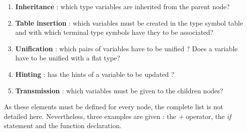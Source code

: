 \documentclass[a4paper,11pt]{article}
\begin{document}
\begin{enumerate}
	\item \textbf{Inheritance} : which type variables are inherited from the parent node?
	\item \textbf{Table insertion} : which variables must be created in the type symbol table and with which terminal type symbols have they to be associated?
	\item \textbf{Unification} : which pairs of variables have to be unified ? Does a variable have to be unified with a flat type?
	\item \textbf{Hinting} : has the hints of a variable to be updated ?
	\item \textbf{Transmission} : which variables must be given to the children nodes?
\end{enumerate}
As these elements must be defined for every node, the complete list is not detailed here. Nevertheless, three examples are given : the \textit{+} operator, the \textit{if} statement and the function declaration.
\end{document}
